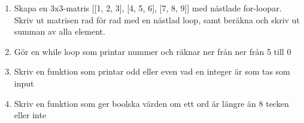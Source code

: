 \documentclass[11pt,a4paper]{article}
\begin{document}
\begin{enumerate}
    Här är förberdelsekod du behöver:
    \begin{lstlisting}
        # Förberedelsekod: Skapar ursprungsposten
        meddelande = """Kära katt, du är den underbaraste katt som finns.
        När en katt spinner blir man alltid glad.
        Tack för att du är min katt!"""

        with open("karleksbrev_katt.txt", "w") as fil:
            fil.write(meddelande)
    \end{lstlisting}
    \item Skapa en 3x3-matris [[1, 2, 3], [4, 5, 6], [7, 8, 9]] med nästlade for-loopar. Skriv ut matrisen rad för rad med en nästlad loop, samt beräkna och skriv ut summan av alla element.
    \item Gör en while loop som printar nummer och räknar ner från ner från 5 till 0
    \item Skriv en funktion som printar odd eller even vad en integer är som tas som input
    \item Skriv en funktion som ger boolska värden om ett ord är längre än 8 tecken eller inte
\end{enumerate}
\end{document}
